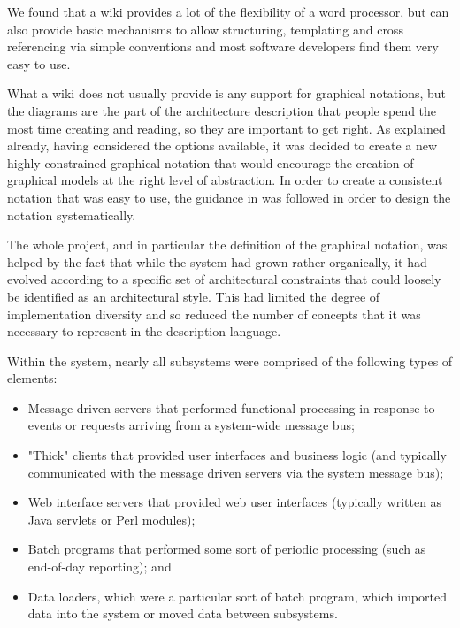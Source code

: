   We found that a wiki provides a lot of the flexibility of a word processor, but can also provide basic mechanisms to allow structuring, templating and cross referencing via simple conventions and most software developers find them very easy to use.

  What a wiki does not usually provide is any support for graphical notations, but the diagrams are the part of the architecture description that people spend the most time creating and reading, so they are important to get right.  As explained already, having considered the options available, it was decided to create a new highly constrained graphical notation that would encourage the creation of graphical models at the right level of abstraction.  In order to create a consistent notation that was easy to use, the guidance in \cite{moody2009-notations} was followed in order to design the notation systematically.

  The whole project, and in particular the definition of the graphical notation, was helped by the fact that while the system had grown rather organically, it had evolved according to a specific set of architectural constraints that could loosely be identified as an architectural style.  This had limited the degree of implementation diversity and so reduced the number of concepts that it was necessary to represent in the description language.

  Within the system, nearly all subsystems were comprised of the following types of elements:

  \begin{itemize}

\item Message driven servers that performed functional processing in response to events or requests arriving from a system-wide message bus;

\item "Thick" clients that provided user interfaces and business logic (and typically communicated with the message driven servers via the system message bus);

\item Web interface servers that provided web user interfaces (typically written as Java servlets or Perl modules);

\item Batch programs that performed some sort of periodic processing (such as end-of-day reporting); and 

\item Data loaders, which were a particular sort of batch program, which imported data into the system or moved data between subsystems.

\end{itemize}


